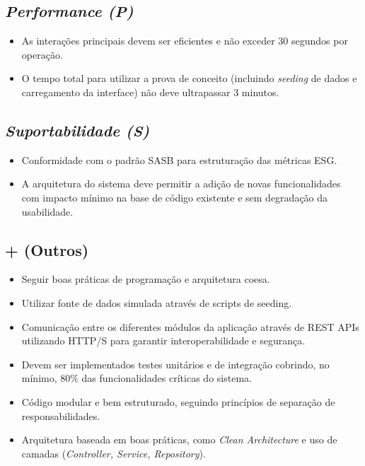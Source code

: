 \subsection{\textit{Performance (P)}}
\begin{itemize}
    \item As interações principais devem ser eficientes e não exceder 30 segundos por operação.
    \item O tempo total para utilizar a prova de conceito (incluindo \textit{seeding} de dados e carregamento da interface) não deve ultrapassar 3 minutos.
\end{itemize}

\subsection{\textit{Suportabilidade (S)}}
\begin{itemize}
    \item Conformidade com o padrão \gls{SASB} para estruturação das métricas \gls{ESG}.
    \item A arquitetura do sistema deve permitir a adição de novas funcionalidades com impacto mínimo na base de código existente e sem degradação da usabilidade.
\end{itemize}

\subsection{+ (Outros)}
\begin{itemize}
    \item Seguir boas práticas de programação e arquitetura coesa.
    \item Utilizar fonte de dados simulada através de scripts de seeding.
    \item Comunicação entre os diferentes módulos da aplicação através de REST APIs utilizando HTTP/S para garantir interoperabilidade e segurança.
    \item Devem ser implementados testes unitários e de integração cobrindo, no mínimo, 80\% das funcionalidades críticas do sistema.
    \item Código modular e bem estruturado, seguindo princípios de separação de responsabilidades.
    \item Arquitetura baseada em boas práticas, como \textit{Clean Architecture} e uso de camadas (\textit{Controller, Service, Repository}).
\end{itemize}

